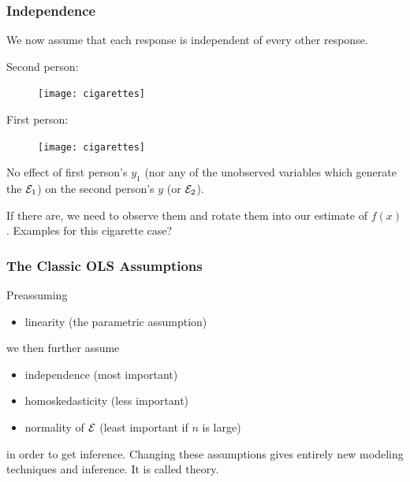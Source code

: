 \documentclass[slides]{beamer} %
\begin{document}
\begin{frame}\frametitle{Independence}

We now assume that each response is independent of every other response.\\



\begin{minipage}{0.55\textwidth}
\footnotesize Second person:
\begin{figure}
\centering
\texttt{[image: cigarettes]}
\end{figure}
First person:
\begin{figure}
\centering
\texttt{[image: cigarettes]}
\end{figure}
\end{minipage}
\begin{minipage}{0.35\textwidth}
\normalsize
No effect of first person's $y_1$ (nor any of the unobserved variables which generate the $\mathcal{E}_1$) on the second person's $y$ (or $\mathcal{E}_2$). \\ \pause

If there are, we need to observe them and rotate them into our estimate of $f(x)$. Examples for this cigarette case?
\end{minipage}

\end{frame}


\begin{frame}\frametitle{The Classic OLS Assumptions}

Preassuming

\begin{itemize}
\item linearity (the parametric assumption)
\end{itemize}

we then	further assume

\begin{itemize}
\item independence (most important)
\item homoskedasticity (less important)
\item normality of $\mathcal{E}$ (least important if $n$ is large)
\end{itemize}

in order to get inference. Changing these assumptions gives entirely new modeling techniques and inference. It is called  theory.

\end{frame}
\end{document}
